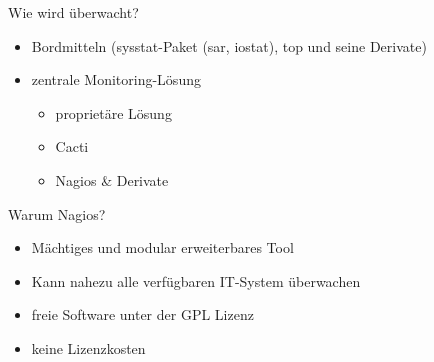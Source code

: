 \documentclass[12pt]{beamer}              %
\begin{document}
\begin{frame}{Wie wird überwacht?}
	\begin{itemize}
		\item Bordmitteln (sysstat-Paket (sar, iostat), top und seine Derivate)
		\item zentrale Monitoring-Lösung
		\begin{itemize}
			\item proprietäre Lösung
			\item Cacti
			\item Nagios \& Derivate
		\end{itemize}
	\end{itemize}
	
\end{frame}
\begin{frame}{Warum Nagios?}
	\begin{itemize}
		\item Mächtiges und modular erweiterbares Tool
		\item Kann nahezu alle verfügbaren IT-System überwachen
		\item freie Software unter der GPL Lizenz
		\item keine Lizenzkosten
	\end{itemize}
\end{frame}
\end{document}
